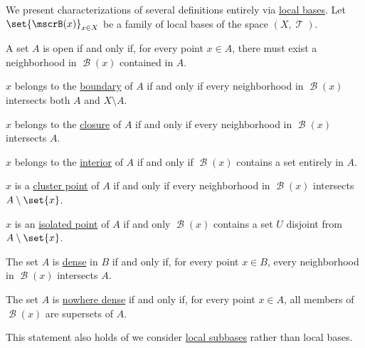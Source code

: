 \begin{proposition}\label{thm:properties_via_bases}
  We present characterizations of several definitions entirely via \hyperref[def:topological_local_base]{local bases}. Let \( \set{ \mscrB(x) }_{x \in X} \) be a family of local bases of the space \( (X, \mscrT) \).

  \begin{thmenum}
     A set \( A \) is open if and only if, for every point \( x \in A \), there must exist a neighborhood in \( \mscrB(x) \) contained in \( A \).

     \( x \) belongs to the \hyperref[def:topological_boundary_operator]{boundary} of \( A \) if and only if every neighborhood in \( \mscrB(x) \) intersects both \( A \) and \( X \setminus A \).

     \( x \) belongs to the \hyperref[def:topological_closure_operator]{closure} of \( A \) if and only if every neighborhood in \( \mscrB(x) \) intersects \( A \).

     \( x \) belongs to the \hyperref[def:topological_interior_operator]{interior} of \( A \) if and only if \( \mscrB(x) \) contains a set entirely in \( A \).

     \( x \) is a \hyperref[def:cluster_point]{cluster point} of \( A \) if and only if every neighborhood in \( \mscrB(x) \) intersects \( A \setminus \set{ x } \).

     \( x \) is an \hyperref[def:cluster_point]{isolated point} of \( A \) if and only \( \mscrB(x) \) contains a set \( U \) disjoint from \( A \setminus \set{ x } \).

     The set \( A \) is \hyperref[def:topologically_dense_set]{dense} in \( B \) if and only if, for every point \( x \in B \), every neighborhood in \( \mscrB(x) \) intersects \( A \).

     The set \( A \) is \hyperref[def:topologically_dense_set]{nowhere dense} if and only if, for every point \( x \in A \), all members of \( \mscrB(x) \) are supersets of \( A \).

    This statement also holds of we consider \hyperref[def:topological_local_subbase]{local subbases} rather than local bases.
  \end{thmenum}
\end{proposition}

